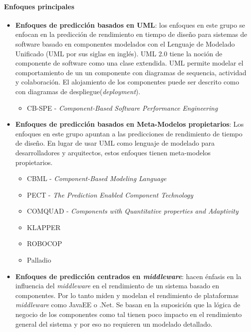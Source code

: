 \paragraph{Enfoques principales}
\begin{itemize}
    \item \textbf{Enfoques de predicción basados en UML}: los enfoques en este grupo se enfocan en la predicción de rendimiento en tiempo de diseño para sistemas de software basado en componentes modelados con el Lenguaje de Modelado Unificado (UML por sus siglas en inglés). UML 2.0 tiene la noción de componente de software como una clase extendida. UML permite modelar el comportamiento de un un componente con diagramas de sequencia, actividad y colaboración. El alojamiento de los componentes puede ser descrito como con diagramas de despliegue(\emph{deployment}).     
    \begin{itemize}
        \item CB-SPE - \emph{Component-Based Software Performance Engineering} 
    \end{itemize}
    \item \textbf{Enfoques de predicción basados en Meta-Modelos propietarios}: Los enfoques en este grupo apuntan a las predicciones de rendimiento de tiempo de diseño. En lugar de usar UML como lenguaje de modelado para desarrolladores y arquitectos, estos enfoques tienen meta-modelos propietarios.
    \begin{itemize}
        \item CBML - \emph{Component-Based Modeling Language}
        \item PECT - \emph{The Prediction Enabled Component Technology}
        \item COMQUAD - \emph{Components with Quantitative properties and Adaptivity}
        \item KLAPPER
        \item ROBOCOP
        \item Palladio        
    \end{itemize}
    \item \textbf{Enfoques de predicción centrados en \emph{middleware}}: hacen énfasis en la influencia del \emph{middleware} en el rendimiento de un sistema basado en componentes. Por lo tanto miden y modelan el rendimiento de plataformas \emph{middleware} como JavaEE o .Net. Se basan en la suposición que la lógica de negocio de los componentes como tal tienen poco impacto en el rendimiento general del sistema y por eso no requieren un modelado detallado.

\end{itemize}
